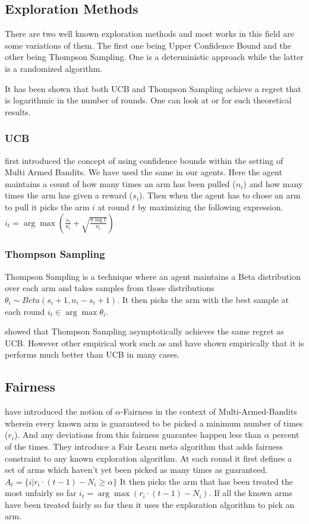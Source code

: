 \subsection{Exploration Methods}
There are two well known exploration methods and most works in this field are some variations of them. The first one being Upper Confidence Bound and the other being Thompson Sampling. One is a deterministic approach while the latter is a randomized algorithm.

It has been shown that both UCB and Thompson Sampling achieve a regret that is logarithmic in the number of rounds. One can look at  or  for such theoretical results.

\subsubsection{UCB}
 first introduced the concept of using confidence bounds within the setting of Multi Armed Bandits. We have used the same in our agents. Here the agent maintains a count of how many times an arm has been pulled ($n_i$) and how many times the arm has given a reward ($s_i$). Then when the agent has to chose an arm to pull it picks the arm $i$ at round $t$ by maximizing the following expression. $i_t = \arg\max ( \frac{s_i}{n_i} + \sqrt{\frac{8\log t}{n_i} })$

\subsubsection{Thompson Sampling}
Thompson Sampling is a technique where an agent maintains a Beta distribution over each arm and takes samples from those distributions $\theta_i \sim Beta(s_i + 1, n_i - s_i + 1)$. It then picks the arm with the best sample at each round $i_t \in \arg\max \theta_i$. 

 showed that Thompson Sampling asymptotically achieves the same regret as UCB. However other empirical work such as  and  have shown empirically that it is performs much better than UCB in many cases. 

\subsection{Fairness}
 have introduced the notion of $\alpha$-Fairness in the context of Multi-Armed-Bandits wherein every known arm is guaranteed to be picked a minimum number of times ($r_i$). And any deviations from this fairness guarantee happen less than $\alpha$ percent of the times. They introduce a Fair Learn meta algorithm that adds fairness constraint to any known exploration algorithm. At each round it first defines a set of arms which haven't yet been picked as many times as guaranteed. $A_t = \{i | r_i \cdot (t-1) - N_i \geq \alpha\}$ It then picks the arm that has been treated the most unfairly so far $i _t = \arg\max (r_i \cdot (t-1) - N_i)$. If all the known arms have been treated fairly so far then it uses the exploration algorithm to pick an arm.
